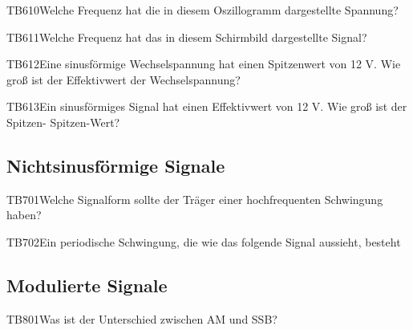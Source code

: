 \begin{question}{TB610}{Welche Frequenz hat die in diesem Oszillogramm dargestellte Spannung?}
\end{question}

\begin{question}{TB611}{Welche Frequenz hat das in diesem Schirmbild dargestellte Signal?}
\end{question}

\begin{question}{TB612}{Eine sinusförmige Wechselspannung hat einen Spitzenwert von 12 V. Wie groß ist der Effektivwert der Wechselspannung?}
\end{question}

\begin{question}{TB613}{Ein sinusförmiges Signal hat einen Effektivwert von 12 V. Wie groß ist der Spitzen- Spitzen-Wert?}
\end{question}

\subsection{Nichtsinusförmige Signale}

\begin{question}{TB701}{Welche Signalform sollte der Träger einer hochfrequenten Schwingung haben?}
\end{question}

\begin{question}{TB702}{Ein periodische Schwingung, die wie das folgende Signal aussieht, besteht}
\end{question}

\subsection{Modulierte Signale}

\begin{question}{TB801}{Was ist der Unterschied zwischen AM und SSB?}
\end{question}

